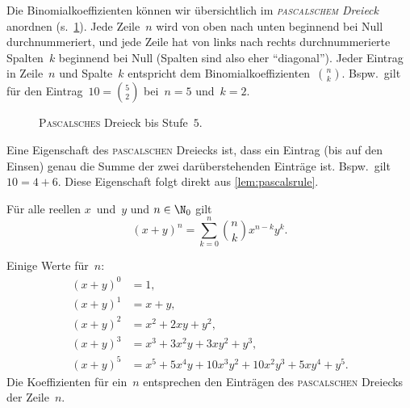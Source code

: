 \documentclass[a4paper]{article}
\begin{document}
Die Binomialkoeffizienten können wir übersichtlich im \emph{\textsc{pascalschem} Dreieck} anordnen (s.~\cref{fig:pascalstriangle}). Jede Zeile~$n$ wird von oben nach unten beginnend bei Null durchnummeriert, und jede Zeile hat von links nach rechts durchnummerierte Spalten~$k$ beginnend bei Null (Spalten sind also eher "`diagonal"'). Jeder Eintrag in Zeile~$n$ und Spalte~$k$ entspricht dem Binomialkoeffizienten~$\binom{n}{k}$. Bspw.\ gilt für den Eintrag~$10 = \binom{5}{2}$ bei~$n = 5$ und~$k = 2$.

\begin{figure}[htbp]
    \caption{\textsc{Pascalsches} Dreieck bis Stufe~$5$.}\label{fig:pascalstriangle}
\end{figure}

Eine Eigenschaft des \textsc{pascalschen} Dreiecks ist, dass ein Eintrag (bis auf den Einsen) genau die Summe der zwei darüberstehenden Einträge ist. Bspw.\ gilt~$10 = 4 + 6$. Diese Eigenschaft folgt direkt aus \cref{lem:pascalsrule}.

\begin{theorem}
    Für alle reellen $x$~und~$y$ und $n \in \N_0$ gilt
    \begin{equation*}
        (x + y)^n = \sum_{k = 0}^n \binom{n}{k} x^{n - k} y^k.
    \end{equation*}
\end{theorem}

Einige Werte für~$n$:
\begin{align*}
    (x+y)^0 & = 1,                                               \\
    (x+y)^1 & = x+y,                                             \\
    (x+y)^2 & = x^2 + 2xy + y^2,                                 \\
    (x+y)^3 & = x^3 + 3x^2y + 3xy^2 + y^3,                       \\
    (x+y)^5 & = x^5 + 5x^4y + 10x^3y^2 + 10x^2y^3 + 5xy^4 + y^5.
\end{align*}
Die Koeffizienten für ein~$n$ entsprechen den Einträgen des \textsc{pascalschen} Dreiecks der Zeile~$n$.
\end{document}
